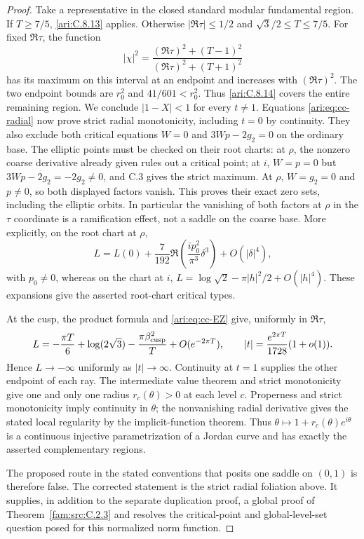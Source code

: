\begin{proof}
Take a representative in the closed standard modular fundamental
region. If $T\ge7/5$, \ref{ari:C.8.13} applies. Otherwise
$|\Re\tau|\le1/2$ and $\sqrt3/2\le T\le7/5$. For fixed
$\Re\tau$, the function
\[
 |\chi|^2=\frac{(\Re\tau)^2+(T-1)^2}
                    {(\Re\tau)^2+(T+1)^2}
\]
has its maximum on this interval at an endpoint and increases
with $(\Re\tau)^2$. The two endpoint bounds are $r_0^2$
and $41/601<r_0^2$. Thus \ref{ari:C.8.14} covers the entire remaining
region. We conclude $|1-X|<1$ for every $t\ne1$.
Equations \eqref{ari:eq:cc-radial} now prove strict radial
monotonicity, including $t=0$ by continuity. They also exclude
both critical equations $W=0$ and $3Wp-2g_2=0$ on the
ordinary base. The elliptic points must be checked on their
root charts: at $\rho$, the nonzero coarse derivative already
given rules out a critical point; at $i$, $W=p=0$ but $3Wp-2g_2=-2g_2\ne0$, and C.3 gives
the strict maximum. At $\rho$, $W=g_2=0$ and $p\ne0$,
so both displayed factors vanish. This proves their exact zero
sets, including the elliptic orbits. In particular the vanishing of both factors at
$\rho$ in the $\tau$ coordinate is a ramification effect,
not a saddle on the coarse base. More explicitly, on the root
chart at $\rho$,
\[
 L=L(0)+\frac7{192}\Re\left(\frac{ip_0^2}{\pi^3}\delta^3\right)
                   +O(|\delta|^4),
\]
with $p_0\ne0$, whereas on the chart at $i$,
$L=\log\sqrt2-\pi|h|^2/2+O(|h|^4)$.
These expansions give the asserted root-chart critical types.

At the cusp, the product formula and \eqref{ari:eq:cc-EZ} give,
uniformly in $\Re\tau$,
\[
 L=-\frac{\pi T}{6}+\log(2\sqrt3)-
                      \frac{\pi\beta_{\rm cusp}^2}{T}+O(e^{-2\pi T}),
 \qquad |t|=\frac{e^{2\pi T}}{1728}(1+o(1)).
\]
Hence $L\to-\infty$ uniformly as $|t|\to\infty$.
Continuity at $t=1$ supplies the other endpoint of each ray.
The intermediate value theorem and strict monotonicity give
one and only one radius $r_c(\theta)>0$ at each level $c$.
Properness and strict monotonicity imply continuity in $\theta$;
the nonvanishing radial derivative gives the stated local
regularity by the implicit-function theorem. Thus
$\theta\mapsto1+r_c(\theta)e^{i\theta}$ is a continuous
injective parametrization of a Jordan curve and has exactly
the asserted complementary regions.

The proposed route in the stated conventions that posits one saddle on
$(0,1)$ is therefore false. The corrected statement is the
strict radial foliation above. It supplies, in addition to
the separate duplication proof, a global proof of Theorem~\ref{fam:src:C.2.3} and
resolves the critical-point and global-level-set question
posed for this normalized norm function.
\end{proof}


